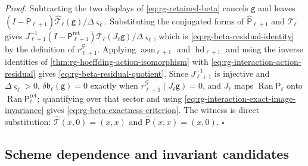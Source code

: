 \noindent\emph{Proof.}
Subtracting the two displays of \eqref{eq:rg-retained-beta} cancels \(\mathsf g\) and
leaves \((I-\widehat{\mathsf P}_{\ell+1})\widehat{\mathcal T}_\ell(\mathsf g)/\Delta\varsigma_\ell\).
Substituting the conjugated forms of \(\widehat{\mathsf P}_{\ell+1}\) and
\(\widehat{\mathcal T}_\ell\) gives
\(J_{\ell+1}^{-1}(I-\mathsf P^{\mathrm{ret}}_{\ell+1})\mathcal T_\ell(J_\ell\mathsf g)/
\Delta\varsigma_\ell\), which is \eqref{eq:rg-beta-residual-identity} by the
definition of \(r^{\mathcal G}_{\ell+1}\). Applying \(\operatorname{asm}_{\ell+1}\) and
\(\operatorname{hd}_{\ell+1}\) and using the inverse identities of
\cref{thm:rg-hoeffding-action-isomorphism} with
\eqref{eq:rg-interaction-action-residual} gives
\eqref{eq:rg-beta-residual-quotient}. Since \(J_{\ell+1}^{-1}\) is injective and
\(\Delta\varsigma_\ell>0\), \(\delta\mathfrak b_\ell(\mathsf g)=0\) exactly when
\(r^{\mathcal G}_{\ell+1}(J_\ell\mathsf g)=0\), and \(J_\ell\) maps
\(\operatorname{Ran}\widehat{\mathsf P}_\ell\) onto
\(\operatorname{Ran}\mathsf P^{\mathrm{ret}}_\ell\); quantifying over that sector
and using \eqref{eq:rg-interaction-exact-image-invariance} gives
\eqref{eq:rg-beta-exactness-criterion}. The witness is direct substitution:
\(\widehat{\mathcal T}(x,0)=(x,x)\) and \(\widehat{\mathsf P}(x,x)=(x,0)\). \(\square\)

\subsection{Scheme dependence and invariant candidates}
\label{sec:rg-scheme-dependence}

